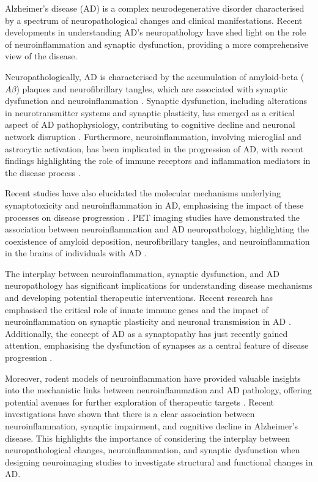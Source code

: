 \documentclass[10pt]{article}
\begin{document}
\begin{sloppypar}
  Alzheimer's disease (AD) is a complex neurodegenerative disorder characterised by a spectrum of neuropathological changes and clinical manifestations. Recent developments in understanding AD's neuropathology have shed light on the role of neuroinflammation and synaptic dysfunction, providing a more comprehensive view of the disease.

  Neuropathologically, AD is characterised by the accumulation of amyloid-beta ($A\beta$) plaques and neurofibrillary tangles, which are associated with synaptic dysfunction and neuroinflammation \citep{marcello_synaptic_2012}. Synaptic dysfunction, including alterations in neurotransmitter systems and synaptic plasticity, has emerged as a critical aspect of AD pathophysiology, contributing to cognitive decline and neuronal network disruption \citep{marcello_synaptic_2012}. Furthermore, neuroinflammation, involving microglial and astrocytic activation, has been implicated in the progression of AD, with recent findings highlighting the role of immune receptors and inflammation mediators in the disease process \citep{heneka_neuroinflammation_2015}.

  Recent studies have also elucidated the molecular mechanisms underlying synaptotoxicity and neuroinflammation in AD, emphasising the impact of these processes on disease progression \citep{marttinen_molecular_2018}. PET imaging studies have demonstrated the association between neuroinflammation and AD neuropathology, highlighting the coexistence of amyloid deposition, neurofibrillary tangles, and neuroinflammation in the brains of individuals with AD \citep{zhou_pet_2021}.

  The interplay between neuroinflammation, synaptic dysfunction, and AD neuropathology has significant implications for understanding disease mechanisms and developing potential therapeutic interventions. Recent research has emphasised the critical role of innate immune genes and the impact of neuroinflammation on synaptic plasticity and neuronal transmission in AD \citep{ransohoff_how_2016}. Additionally, the concept of AD as a synaptopathy has just recently gained attention, emphasising the dysfunction of synapses as a central feature of disease progression \citep{meftah_alzheimers_2023}.

  Moreover, rodent models of neuroinflammation have provided valuable insights into the mechanistic links between neuroinflammation and AD pathology, offering potential avenues for further exploration of therapeutic targets \citep{nazem_rodent_2015}. Recent investigations have shown that there is a clear association between neuroinflammation, synaptic impairment, and cognitive decline in Alzheimer's disease. This highlights the importance of considering the interplay between neuropathological changes, neuroinflammation, and synaptic dysfunction when designing neuroimaging studies to investigate structural and functional changes in AD.


\end{sloppypar}
\end{document}
